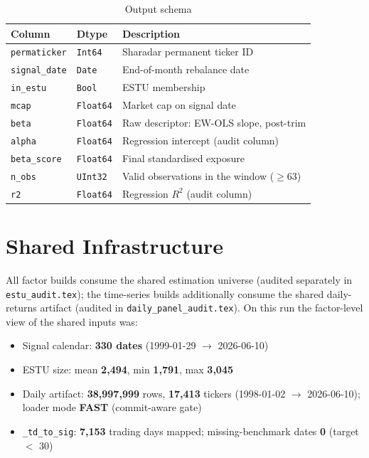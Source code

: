 \documentclass[11pt,a4paper]{article}
\begin{document}
\begin{table}[h!]
\centering
\caption{Output schema}
\begin{tabular}{llp{7.4cm}}
\toprule
\textbf{Column} & \textbf{Dtype} & \textbf{Description} \\
\midrule
\texttt{permaticker} & \texttt{Int64} & Sharadar permanent ticker ID \\
\texttt{signal\_date} & \texttt{Date} & End-of-month rebalance date \\
\texttt{in\_estu} & \texttt{Bool} & ESTU membership \\
\texttt{mcap} & \texttt{Float64} & Market cap on signal date \\
\texttt{beta} & \texttt{Float64} & Raw descriptor: EW-OLS slope, post-trim \\
\texttt{alpha} & \texttt{Float64} & Regression intercept (audit column) \\
\texttt{beta\_score} & \texttt{Float64} & Final standardised exposure \\
\texttt{n\_obs} & \texttt{UInt32} & Valid observations in the window ($\geq 63$) \\
\texttt{r2} & \texttt{Float64} & Regression $R^2$ (audit column) \\
\bottomrule
\end{tabular}
\end{table}

\section{Shared Infrastructure}

All factor builds consume the shared estimation universe
 (audited separately in
\texttt{estu\_audit.tex}); the time-series builds additionally consume the
shared daily-returns artifact (audited in \texttt{daily\_panel\_audit.tex}).
On this run the factor-level view of the shared inputs was:

\begin{itemize}[leftmargin=*,topsep=2pt,itemsep=2pt]
  \item Signal calendar: \textbf{330 dates} (1999-01-29 $\to$ 2026-06-10)
  \item ESTU size: mean \textbf{2{,}494}, min \textbf{1{,}791}, max \textbf{3{,}045}
  \item Daily artifact: \textbf{38{,}997{,}999} rows, \textbf{17{,}413} tickers (1998-01-02 $\to$ 2026-06-10); loader mode \textbf{FAST} (commit-aware gate)
  \item \texttt{\_td\_to\_sig}: \textbf{7{,}153} trading days mapped; missing-benchmark dates \textbf{0} (target $<$ 30)
\end{itemize}
\end{document}
